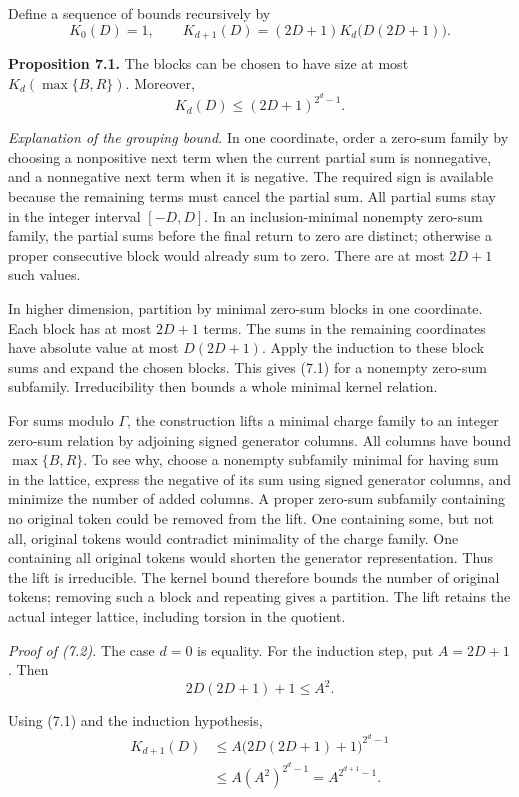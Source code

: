 \documentclass[english,11pt,a4paper]{article}
\newcounter{none}
\begin{document}
Define a sequence of bounds recursively by
\[K_0(D)=1,\qquad
K_{d+1}(D)=(2D+1)K_d\bigl(D(2D+1)\bigr).                           \tag{7.1}\]

\textbf{Proposition 7.1.} The blocks can be chosen to have size at most \(K_d(\max\{B,R\})\). Moreover,
\[K_d(D)\leq(2D+1)^{2^d-1}.                                         \tag{7.2}\]

\emph{Explanation of the grouping bound.} In one coordinate, order a zero-sum family by choosing a nonpositive next term when the current partial sum is nonnegative, and a nonnegative next term when it is negative. The required sign is available because the remaining terms must cancel the partial sum. All partial sums stay in the integer interval \([-D,D]\). In an inclusion-minimal nonempty zero-sum family, the partial sums before the final return to zero are distinct; otherwise a proper consecutive block would already sum to zero. There are at most \(2D+1\) such values.

In higher dimension, partition by minimal zero-sum blocks in one coordinate. Each block has at most \(2D+1\) terms. The sums in the remaining coordinates have absolute value at most \(D(2D+1)\). Apply the induction to these block sums and expand the chosen blocks. This gives (7.1) for a nonempty zero-sum subfamily. Irreducibility then bounds a whole minimal kernel relation.

For sums modulo \(\Gamma\), the construction lifts a minimal charge family to an integer zero-sum relation by adjoining signed generator columns. All columns have bound \(\max\{B,R\}\). To see why, choose a nonempty subfamily minimal for having sum in the lattice, express the negative of its sum using signed generator columns, and minimize the number of added columns. A proper zero-sum subfamily containing no original token could be removed from the lift. One containing some, but not all, original tokens would contradict minimality of the charge family. One containing all original tokens would shorten the generator representation. Thus the lift is irreducible. The kernel bound therefore bounds the number of original tokens; removing such a block and repeating gives a partition. The lift retains the actual integer lattice, including torsion in the quotient.

\emph{Proof of (7.2).} The case \(d=0\) is equality. For the induction step, put \(A=2D+1\). Then
\[2D(2D+1)+1\leq A^2.\]

Using (7.1) and the induction hypothesis,
\[\begin{aligned}
K_{d+1}(D)
&\leq A\bigl(2D(2D+1)+1\bigr)^{2^d-1}\\
&\leq A(A^2)^{2^d-1}
=A^{2^{d+1}-1}.
\end{aligned}\]
\end{document}
